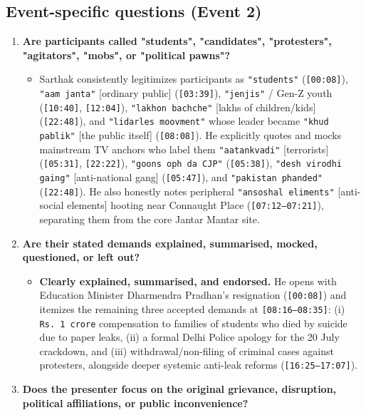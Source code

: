 \documentclass[10pt,a4paper]{article}
\begin{document}
\subsection*{Event-specific questions (Event 2)}
\begin{enumerate}[leftmargin=1.6em, itemsep=4pt, topsep=4pt]
  \item \textbf{Are participants called "students", "candidates", "protesters", "agitators", "mobs", or "political pawns"?}
  \begin{itemize}[leftmargin=1.4em, itemsep=2pt, topsep=2pt]
    \item Sarthak consistently legitimizes participants as \texttt{"students"} (\texttt{[00:08]}), \texttt{"aam janta"} [ordinary public] (\texttt{[03:39]}), \texttt{"jenjis"} / Gen-Z youth (\texttt{[10:40]}, \texttt{[12:04]}), \texttt{"lakhon bachche"} [lakhs of children/kids] (\texttt{[22:48]}), and \texttt{"lidarles moovment"} whose leader became \texttt{"khud pablik"} [the public itself] (\texttt{[08:08]}). He explicitly quotes and mocks mainstream TV anchors who label them \texttt{"aatankvadi"} [terrorists] (\texttt{[05:31]}, \texttt{[22:22]}), \texttt{"goons oph da CJP"} (\texttt{[05:38]}), \texttt{"desh virodhi gaing"} [anti-national gang] (\texttt{[05:47]}), and \texttt{"pakistan phanded"} (\texttt{[22:48]}). He also honestly notes peripheral \texttt{"ansoshal eliments"} [anti-social elements] hooting near Connaught Place (\texttt{[07:12--07:21]}), separating them from the core Jantar Mantar site.
  \end{itemize}
  \item \textbf{Are their stated demands explained, summarised, mocked, questioned, or left out?}
  \begin{itemize}[leftmargin=1.4em, itemsep=2pt, topsep=2pt]
    \item \textbf{Clearly explained, summarised, and endorsed.} He opens with Education Minister Dharmendra Pradhan's resignation (\texttt{[00:08]}) and itemizes the remaining three accepted demands at \texttt{[08:16--08:35]}: (i) \texttt{Rs.\,1 crore} compensation to families of students who died by suicide due to paper leaks, (ii) a formal Delhi Police apology for the 20 July crackdown, and (iii) withdrawal/non-filing of criminal cases against protesters, alongside deeper systemic anti-leak reforms (\texttt{[16:25--17:07]}).
  \end{itemize}
  \item \textbf{Does the presenter focus on the original grievance, disruption, political affiliations, or public inconvenience?}

\end{enumerate}
\end{document}

